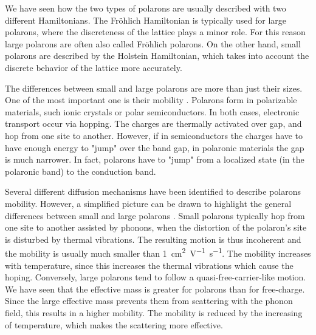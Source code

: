 We have seen how the two types of polarons are usually described with two different Hamiltonians. The Fröhlich Hamiltonian is typically used for large polarons, where the discreteness of the lattice plays a minor role. For this reason large polarons are often also called Fröhlich polarons. On the other hand, small polarons are described by the Holstein Hamiltonian, which takes into account the discrete behavior of the lattice more accurately.

The differences between small and large polarons are more than just their sizes. One of the most important one is their mobility \cite{natanzon2020}. Polarons form in polarizable materials, such ionic crystals or polar semiconductors. In both cases, electronic transport occur via hopping. The charges are thermally activated over gap, and hop from one site to another. However, if in semiconductors the charges have to have enough energy to "jump" over the band gap, in polaronic materials the gap is much narrower. In fact, polarons have to "jump" from a localized state (in the polaronic band) to the conduction band.

Several different diffusion mechanisms have been identified to describe polarons mobility. However, a simplified picture can be drawn to highlight the general differences between small and large polarons \cite{franchini2021b}. Small polarons typically hop from one site to another assisted by phonons, when the distortion of the polaron's site is disturbed by thermal vibrations. The resulting motion is thus incoherent and the mobility is usually much smaller than \SI{1}{cm^2 V^{-1}s^{-1}}. The mobility increases with temperature, since this increases the thermal vibrations which cause the hoping. Conversely, large polarons tend to follow a quasi-free-carrier-like motion. We have seen that the effective mass is greater for polarons than for free-charge. Since the large effective mass prevents them from scattering with the phonon field, this results in a higher mobility. The mobility is reduced by the increasing of temperature, which makes the scattering more effective.
